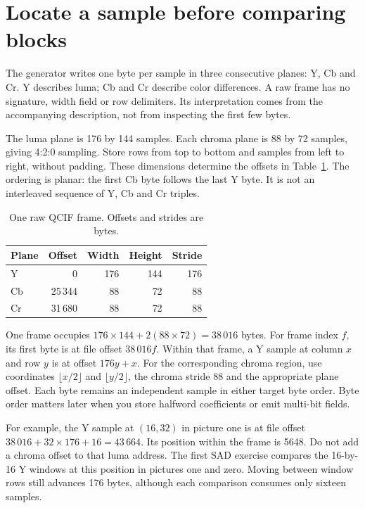 \section{Locate a sample before comparing blocks}
The generator writes one byte per sample in three consecutive planes: Y, Cb and
Cr. Y describes luma; Cb and Cr describe color differences. A raw frame has no
signature, width field or row delimiters. Its interpretation comes from the
accompanying description, not from inspecting the first few bytes.

The luma plane is 176 by 144 samples. Each chroma plane is 88 by 72 samples, giving
4:2:0 sampling. Store rows from top to bottom and samples from left to right, without
padding. These dimensions determine the offsets in Table~\ref{tab:h263-planes}.
The ordering is planar: the first Cb byte follows the last Y byte. It is not an
interleaved sequence of Y, Cb and Cr triples.

\begin{table}[htbp]
  \centering
  \caption{One raw QCIF frame. Offsets and strides are bytes.}\label{tab:h263-planes}
  \begin{tabular}{lrrrr}
    \toprule
    Plane & Offset  & Width & Height & Stride \\
    \midrule
    Y     & 0       & 176   & 144    & 176    \\
    Cb    & 25\,344 & 88    & 72     & 88     \\
    Cr    & 31\,680 & 88    & 72     & 88     \\
    \bottomrule
  \end{tabular}
\end{table}

One frame occupies $176\times144+2(88\times72)=38\,016$ bytes. For frame index
$f$, its first byte is at file offset $38\,016f$. Within that frame, a Y sample
at column $x$ and row $y$ is at offset $176y+x$. For the corresponding chroma
region, use coordinates $\lfloor x/2\rfloor$ and $\lfloor y/2\rfloor$, the chroma
stride 88 and the appropriate plane offset. Each byte remains an independent
sample in either target byte order. Byte order matters later when you store
halfword coefficients or emit multi-bit fields.

For example, the Y sample at $(16,32)$ in picture one is at file offset
$38\,016+32\times176+16=43\,664$. Its position within the frame is 5648. Do not
add a chroma offset to that luma address. The first SAD exercise compares the
16-by-16 Y windows at this position in pictures one and zero. Moving between
window rows still advances 176 bytes, although each comparison consumes only
sixteen samples.

